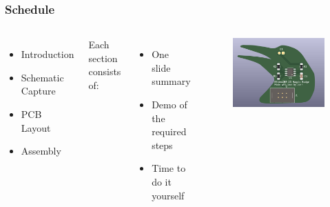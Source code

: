 \documentclass[aspectratio=169, t]{beamer}
\begin{document}
\begin{frame}
	\frametitle{Schedule}
	\begin{columns}
		\vspace{-8mm}
			\begin{itemize}
				\item Introduction
				\item Schematic Capture
				\item PCB Layout
				\item Assembly
			\end{itemize}

		\vspace{1em}

		Each section consists of:
		\begin{itemize}
			\item One slide summary
			\item Demo of the required steps
			\item Time to do it yourself
		\end{itemize}
		
			\begin{figure}
				\includegraphics[width=1.0\linewidth]{images/cleanup_silk.png}
			\end{figure}
	\end{columns}
	\end{frame}
\end{document}
